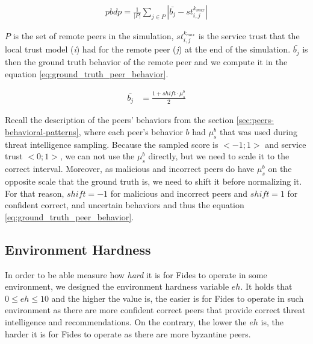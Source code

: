 \begin{equation}
\begin{split}
    pbdp = \frac{1}{|P|} \sum_{j \in P}\left|\bar{b_{j}} - st^{k_{max}}_{i, j} \right|
\end{split}
\label{eq:peers_behavior_detection_metric}
\end{equation}

$P$ is the set of remote peers in the simulation, $st^{k_{max}}_{i, j}$ is the service trust that the local trust model (\textit{i}) had for the remote peer (\textit{j}) at the end of the simulation.
$\bar{b_{j}}$ is then the ground truth behavior of the remote peer and we compute it in the equation \ref{eq:ground_truth_peer_behavior}.

\begin{equation}
    \begin{split}
    \bar{b_{j}} &= \frac{1 + shift \cdot \mu^{b}_{s}}{2}
    \end{split}
    \label{eq:ground_truth_peer_behavior}
\end{equation}

Recall the description of the peers' behaviors from the section \ref{sec:peers-behavioral-patterns}, where each peer's behavior $b$ had $\mu^{b}_{s}$ that was used during threat intelligence sampling.
Because the sampled score is $<-1; 1>$ and service trust $<0; 1>$, we can not use the $\mu^{b}_{s}$ directly, but we need to scale it to the correct interval.
Moreover, as malicious and incorrect peers  do have $\mu^{b}_{s}$ on the opposite scale that the ground truth is, we need to shift it before normalizing it.
For that reason, $shift = -1$ for malicious and incorrect peers and $shift = 1$ for confident correct, and uncertain behaviors and thus the equation \ref{eq:ground_truth_peer_behavior}.

\subsection{Environment Hardness}
\label{subsec:environment-hardness}
In order to be able measure how \textit{hard} it is for Fides to operate in some environment, we designed the environment hardness variable $eh$.
It holds that $0 \leq eh \leq 10$ and the higher the value is, the easier is for Fides to operate in such environment as there are more confident correct peers that provide correct threat intelligence and recommendations.
On the contrary, the lower the $eh$ is, the harder it is for Fides to operate as there are more byzantine peers.

